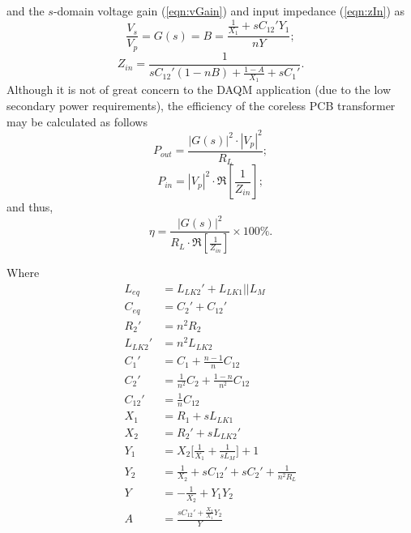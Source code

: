 \documentclass[conference]{IEEEtran}
\begin{document}
\hspace{-20pt} and the $s$-domain voltage gain (\ref{eqn:vGain}) and input impedance (\ref{eqn:zIn}) as
%
\begin{equation}
	\label{eqn:vGain}
	\frac{V_{s}}{V_{p}} = G(s) = B = \frac{\frac{1}{X_{1}}+sC_{12}'Y_{1}}{nY};
\end{equation}
%
\begin{equation}
	\label{eqn:zIn}
	Z_{in} = \frac{1}{sC_{12}'(1-nB)+\frac{1-A}{X_{1}}+sC_{1}'}.
\end{equation}
%
Although it is not of great concern to the DAQM application (due to the low secondary power requirements), the efficiency of the coreless PCB transformer may be calculated as follows \cite{TangHuiFundamental}
\begin{equation}
	P_{out} = \frac{|G(s)|^{2}\cdot|V_{p}|^{2}}{R_{L}};
\end{equation}
\begin{equation}
	P_{in} = |V_{p}|^{2}\cdot\Re \left[ \frac{1}{Z_{in}} \right];
\end{equation}
and thus, \\
\begin{equation}
	\eta = \frac{|G(s)|^{2}}{R_{L}\cdot\Re \left[ \frac{1}{Z_{in}} \right]}\times 100 \%.
\end{equation}

\hspace{-20pt} Where \\

\begin{align*}
	L_{eq}   &= L_{LK2}'+L_{LK1}||L_{M} 	\\
	C_{eq}   &= C_{2}'+C_{12}'				\\
	R_{2}'   &= n^{2}R_{2}					\\
	L_{LK2}' &= n^{2}L_{LK2}				\\
	C_{1}'   &= C_{1} + \frac{n-1}{n}C_{12}	\\
	C_{2}'   &= \frac{1}{n^{2}}C_{2} + \frac{1-n}{n^{2}}C_{12}	\\
	C_{12}'  &= \frac{1}{n}C_{12}			\\
	X_{1}    &= R_{1}  + sL_{LK1}			\\
	X_{2}    &= R_{2}' + sL_{LK2}'			\\
	Y_{1}    &= X_{2} \lbrack \frac{1}{X_{1}} + \frac{1}{sL_{M}} \rbrack +1	\\
	Y_{2}    &= \frac{1}{X_{2}} + sC_{12}' + sC_{2}' + \frac{1}{n^{2}R_{L}}	\\
	Y        &= -\frac{1}{X_{2}} + Y_{1}Y_{2}	\\
	A        &= \frac{sC_{12}' + \frac{X_{2}}{X_{1}} Y_{2}}{Y}
\end{align*}
\end{document}

